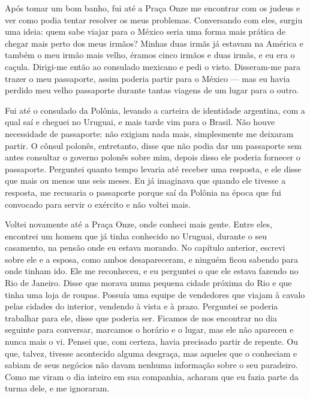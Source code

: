 Após tomar um bom banho, fui até a Praça Onze me encontrar com os judeus
e ver como podia tentar resolver os meus problemas. Conversando com eles, surgiu
uma ideia: quem sabe viajar para o México seria uma forma mais prática de chegar mais perto dos
meus irmãos? Minhas duas irmãs já estavam na América e também o meu
irmão mais velho, éramos cinco irmãos e duas irmãs, e eu era o caçula.
Dirigi-me então ao consulado mexicano e pedi o visto. Disseram-me para
trazer o meu passaporte, assim poderia partir para o
México --- mas eu havia perdido meu velho passaporte durante tantas
viagens de um lugar para o outro.

Fui até o consulado da Polônia, levando a carteira de identidade
argentina, com a qual saí e cheguei no Uruguai, e mais tarde vim para o
Brasil. Não houve necessidade de passaporte: não exigiam nada mais,
simplesmente me deixaram partir. O cônsul polonês, entretanto, disse que
não podia dar um passaporte sem antes consultar o governo polonês sobre
mim, depois disso ele poderia fornecer o passaporte.
Perguntei quanto tempo levaria até receber uma resposta, e ele disse
que mais ou menos uns seis meses. Eu já imaginava que quando ele tivesse
a resposta, me recusaria o passaporte porque saí da Polônia na época que
fui convocado para servir o exército e não voltei mais.


Voltei novamente até a Praça Onze, onde conheci mais gente. Entre
eles, encontrei um homem que já tinha conhecido no Uruguai, durante o seu
casamento, na pensão onde eu estava morando. No capítulo anterior, 
escrevi sobre ele e a esposa, como ambos desapareceram, e ninguém
ficou sabendo para onde tinham ido. Ele me reconheceu, e eu perguntei o
que ele estava fazendo no Rio de Janeiro. Disse que morava numa
pequena cidade próxima do Rio e que tinha uma loja de roupas. Possuía uma 
equipe de vendedores que viajam à cavalo pelas cidades do
interior, vendendo à vista e à prazo. Perguntei se poderia trabalhar para
ele, disse que poderia ser. Ficamos de nos encontrar no dia seguinte
para conversar, marcamos o horário e o lugar, mas ele não apareceu e
nunca mais o vi. Pensei que, com certeza, havia precisado partir de
repente. Ou que, talvez, tivesse acontecido alguma desgraça, mas
aqueles que o conheciam e sabiam de seus negócios não davam nenhuma
informação sobre o seu paradeiro. Como me viram o dia inteiro em sua
companhia, acharam que eu fazia parte da turma dele, e me ignoraram.

